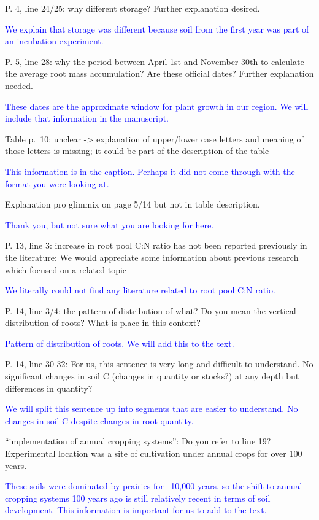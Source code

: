 \documentclass[]{article}
\begin{document}
P. 4, line 24/25: why different storage? Further explanation desired.

\textcolor{blue}{We explain that storage was different because soil from the first year was part of an incubation experiment.}

P. 5, line 28: why the period between April 1st and November 30th to
calculate the average root mass accumulation? Are these official dates?
Further explanation needed.

\textcolor{blue}{These dates are the approximate window for plant growth in our region. We will include that information in the manuscript.}

Table p.~10: unclear -\textgreater{} explanation of upper/lower case
letters and meaning of those letters is missing; it could be part of the
description of the table

\textcolor{blue}{This information is in the caption. Perhaps it did not come through with the format you were looking at.}

Explanation pro glimmix on page 5/14 but not in table description.

\textcolor{blue}{Thank you, but not sure what you are looking for here.}

P. 13, line 3: increase in root pool C:N ratio has not been reported
previously in the literature: We would appreciate some information about
previous research which focused on a related topic

\textcolor{blue}{We literally could not find any literature related to root pool C:N ratio.}

P. 14, line 3/4: the pattern of distribution of what? Do you mean the
vertical distribution of roots? What is place in this context?

\textcolor{blue}{Pattern of distribution of roots. We will add this to the text.}

P. 14, line 30-32: For us, this sentence is very long and difficult to
understand. No significant changes in soil C (changes in quantity or
stocks?) at any depth but differences in quantity?

\textcolor{blue}{We will split this sentence up into segments that are easier to understand. No changes in soil C despite changes in root quantity.}

``implementation of annual cropping systems'': Do you refer to line 19?
Experimental location was a site of cultivation under annual crops for
over 100 years.

\textcolor{blue}{These soils were dominated by prairies for ~10,000 years, so the shift to annual cropping systems 100 years ago is still relatively recent in terms of soil development. This information is important for us to add to the text.}
\end{document}
